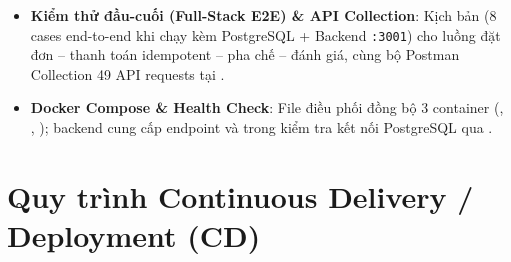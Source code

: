 \documentclass[12pt,a4paper]{report}
\begin{document}
\begin{itemize}[leftmargin=*]
\item \textbf{Kiểm thử đầu-cuối (Full-Stack E2E) \& API Collection}: Kịch bản  (8 cases end-to-end khi chạy kèm PostgreSQL + Backend \texttt{:3001}) cho luồng đặt đơn -- thanh toán idempotent -- pha chế -- đánh giá, cùng bộ Postman Collection 49 API requests tại .
\item \textbf{Docker Compose \& Health Check}: File  điều phối đồng bộ 3 container (, , ); backend cung cấp endpoint  và  trong  kiểm tra kết nối PostgreSQL qua .
\end{itemize}

\section{Quy trình Continuous Delivery / Deployment (CD)}
\end{document}
